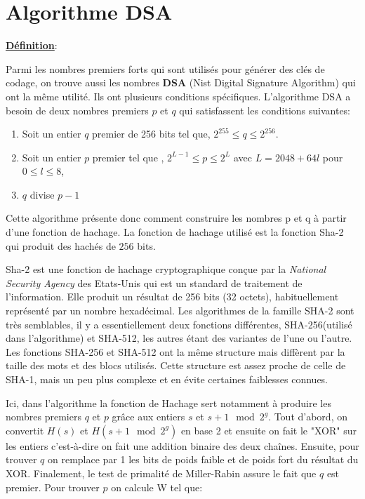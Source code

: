 \section{Algorithme DSA}
\label{Algorithme DSA}
\underline{\textbf{Définition}}:

 Parmi les nombres premiers forts qui sont utilisés pour générer des clés de codage, on trouve aussi les nombres \textbf{DSA} (Nist Digital Signature Algorithm) qui ont la même utilité. Ils ont plusieurs conditions spécifiques. L'algorithme DSA a besoin de deux nombres premiers $p$ et $q$ qui satisfassent les conditions suivantes:


\begin{enumerate}[label=\roman*)]
 \item  Soit un entier $q$ premier de 256 bits tel que,  $2^{255} \leq q \leq 2^{256}$. 
 \item   Soit un entier $p$ premier tel que ,  $2^{L-1} \leq p \leq 2^{L}$ avec $L=2048+64l$ pour $0\leq l \leq 8$,
 \item  $q$ divise $p-1$
\end{enumerate}

Cette algorithme présente donc comment construire les nombres p et q à partir d'une fonction de hachage. La fonction de hachage utilisé est la fonction Sha-2 qui produit des hachés de $256$ bits. 

Sha-2 est une fonction de hachage cryptographique conçue par la \textit{ National Security Agency} des Etats-Unis qui est un standard de traitement de l'information. Elle produit un résultat de 256 bits (32 octets), habituellement représenté par un nombre hexadécimal. Les algorithmes de la famille SHA-2 sont très semblables, il y a essentiellement deux fonctions différentes, SHA-256(utilisé dans l'algorithme) et SHA-512, les autres étant des variantes de l'une ou l'autre. Les fonctions SHA-256 et SHA-512 ont la même structure mais diffèrent par la taille des mots et des blocs utilisés. Cette structure est assez proche de celle de SHA-1, mais un peu plus complexe et en évite certaines faiblesses connues.

Ici, dans l'algorithme la fonction de Hachage sert notamment à produire les nombres premiers $q$ et $p$ grâce aux entiers $s$ et $s+1 \mod 2^g$. Tout d'abord, on convertit $H(s)$ et $H(s+1 \mod 2^g)$ en base 2 et ensuite on fait le "XOR" sur les entiers c'est-à-dire on fait une addition binaire des deux chaînes. Ensuite, pour trouver $q$ on remplace par 1 les bits de poids faible et de poids fort du résultat du XOR. Finalement, le test de primalité de Miller-Rabin assure le fait que $q$ est premier. Pour trouver $p$ on calcule W tel que: 

